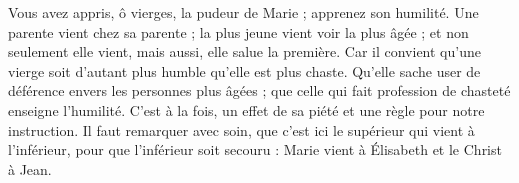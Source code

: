 Vous avez appris, ô vierges, la pudeur de Marie ; apprenez son humilité. Une parente vient chez sa parente ; la plus jeune vient voir la plus âgée ; et non seulement elle vient, mais aussi, elle salue la première. Car il convient qu’une vierge soit d’autant plus humble qu’elle est plus chaste. Qu’elle sache user de déférence envers les personnes plus âgées ; que celle qui fait profession de chasteté enseigne l’humilité. C’est à la fois, un effet de sa piété et une règle pour notre instruction. Il faut remarquer avec soin, que c’est ici le supérieur qui vient à l’inférieur, pour que l’inférieur soit secouru : Marie vient à Élisabeth et le Christ à Jean.